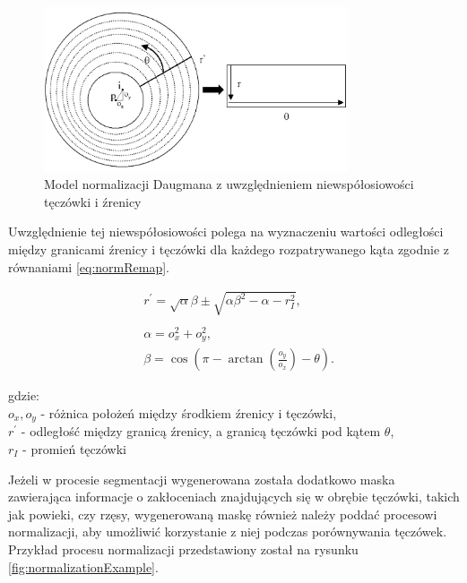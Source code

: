 \begin{figure}[ht]
  \includegraphics[width=0.8\textwidth]{images/normalization/schemaOffCenter.png}
  \centering
  \caption{Model normalizacji Daugmana z uwzględnieniem niewspółosiowości tęczówki i \'zrenicy \cite{aliasingIris}}
  \label{fig:daugmanDiagramOffCenter}
\end{figure}

Uwzględnienie tej niewspółosiowości polega na wyznaczeniu wartości odległości między granicami
\'zrenicy i tęczówki dla każdego rozpatrywanego kąta \cite{masek} zgodnie z równaniami \ref{eq:normRemap}.

\begin{equation}
  \begin{aligned}
    &r^{\prime} = \sqrt{\alpha}\beta \pm \sqrt{\alpha\beta^{2} - \alpha - r_{I}^{2}},
    \\
    \\
    &\alpha = o_{x}^{2} + o_{y}^{2},
    \\
    &\beta = \cos \left( \pi - \arctan \left( \frac{o_{y}}{o_{x}} \right) - \theta \right).
  \end{aligned}
  \label{eq:normRemap}
\end{equation}

\noindent
gdzie:\\
\indent $o_{x}, o_{y}$ - różnica położeń między środkiem \'zrenicy i tęczówki,\\
\indent $r^{\prime}$ - odległoś\'c między granicą \'zrenicy, a granicą tęczówki pod kątem $\theta$,\\
\indent $r_{I}$ - promień tęczówki\newline

Jeżeli w procesie segmentacji wygenerowana została dodatkowo maska zawierająca informacje o
zakłoceniach znajdujących się w obrębie tęczówki, takich jak powieki, czy rzęsy, wygenerowaną
maskę również należy podda\'c procesowi normalizacji, aby umożliwi\'c korzystanie z niej podczas
porównywania tęczówek. Przykład procesu normalizacji przedstawiony został na rysunku \ref{fig:normalizationExample}.

